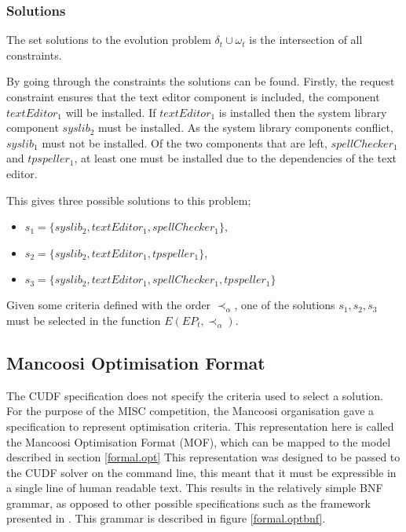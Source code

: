 \subsubsection{Solutions}
The set solutions to the evolution problem $\delta_t \cup \omega_t$ is the intersection of all constraints.

By going through the constraints the solutions can be found.
Firstly, the request constraint ensures that the text editor component is included, the component $textEditor_1$ will be installed.
If $textEditor_1$ is installed then the system library component $syslib_2$ must be installed.
As the system library components conflict, $syslib_1$ must not be installed.
Of the two components that are left, $spellChecker_1$ and $tpspeller_1$, at least one must be installed due to the dependencies of the text editor.

This gives three possible solutions to this problem;
\begin{itemize}
  \item $s_1 = \{syslib_2, textEditor_1, spellChecker_1\}$,
  \item $s_2 = \{syslib_2, textEditor_1, tpspeller_1\}$,
  \item $s_3 = \{syslib_2, textEditor_1, spellChecker_1, tpspeller_1\}$
\end{itemize}

Given some criteria defined with the order $\prec_{\alpha}$, one of the solutions $s_1,s_2,s_3$ must be selected in the function $E(EP_t,\prec_{\alpha})$. 

\subsection{Mancoosi Optimisation Format}
\label{formal.mancoosioptimisationformat}
The CUDF specification does not specify the criteria used to select a solution.
For the purpose of the MISC competition, the Mancoosi organisation gave a specification to represent optimisation criteria.
This representation here is called the Mancoosi Optimisation Format (MOF), which can be mapped to the model described in section \ref{formal.opt}
This representation was designed to be passed to the CUDF solver on the command line, this meant that it must be expressible in a single line of human readable text.
This results in the relatively simple BNF grammar, as opposed to other possible specifications such as the framework presented in \citep{Treinen2009}. 
This grammar is described in figure \ref{formal.optbnf}.

